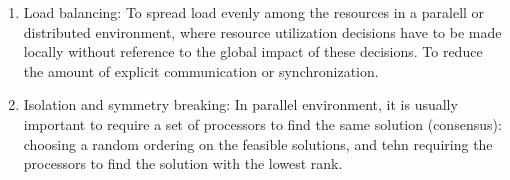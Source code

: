 \documentclass[mathserif]{beamer}
\begin{document}
{\begin{enumerate}
\item Load balancing: To spread load evenly among the resources in a paralell or distributed environment,  where resource utilization decisions have to be made locally without reference to the global impact of these decisions. To reduce the amount of explicit communication or synchronization. 
 
\item Isolation and symmetry breaking: In parallel environment, it is usually important to require a set of processors to find the same solution (consensus): choosing a random ordering on the feasible solutions, and tehn requiring the processors to find the solution with the lowest rank. 
 
\end{enumerate}
}



\end{document}
